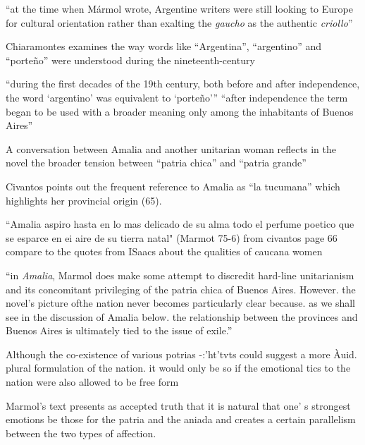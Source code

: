 \enquote{at the time when Mármol wrote, Argentine writers were still looking to Europe for cultural orientation rather than exalting the \textit{gaucho} as the authentic \textit{criollo}} \autocite[62]{Civantos2000}

Chiaramontes examines the way words like \enquote{Argentina}, \enquote{argentino} and \enquote{porteño} were understood during the nineteenth-century \autocite[64]{Civantos2000}

\enquote{during the first decades of the 19th century, both before and after independence, the word \enquote{argentino} was equivalent to \enquote{porteño}} 
\enquote{after independence the term began to be used with a broader meaning only among the inhabitants of Buenos Aires} \autocite[64]{Civantos2000}

A conversation between Amalia and another unitarian woman reflects in the novel the broader tension between \enquote{patria chica} and \enquote{patria grande} \autocite[65]{Civantos2000}

Civantos points out the frequent reference to Amalia as \enquote{la tucumana} which highlights her provincial origin (65).

“Amalia aspiro hasta en lo mas delicado de su alma
todo el perfume poetico que se esparce en ei aire de su tierra natal" (Marmot
75-6) from civantos page 66
compare to the quotes from ISaacs about the qualities of caucana women

\enquote{in \textit{Amalia}, Marmol does make some attempt to discredit hard-line unitarianism and its concomitant privileging of the patria chica of Buenos Aires. However. the novel's picture ofthe nation never becomes particularly clear because. as we shall see in the discussion of Amalia below. the relationship between the provinces and Buenos Aires is ultimately tied to the issue of exile.} 

Although the co-existence of various potrias -:'ht'tvts could suggest a
more Àuid. plural formulation of the nation. it would only be so if the
emotional tics to the nation were also allowed to be free form 

Marmol’s text presents as accepted truth that it is natural that one’ s strongest
emotions be those for the patria and the aniada and creates a certain
parallelism between the two types of affection.
